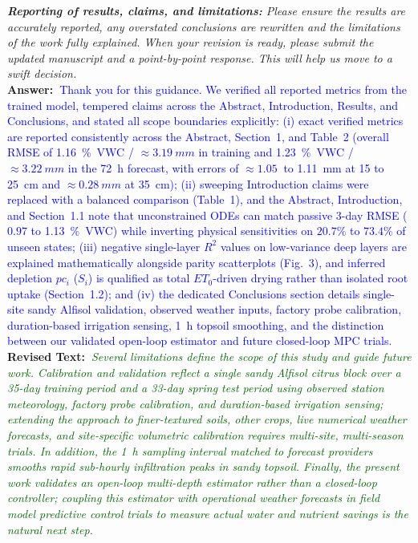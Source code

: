 \documentclass[10pt]{article}
\newcommand{\query}[2][]{\ifthenelse{\equal{#1}{}}{}{\textbf{#1:}~}\emph{#2}}
\newcommand{\ans}[1]{\textbf{Answer:~}#1}
\newcommand{\Rtext}[1]{\textbf{Revised Text:~}#1}
\begin{document}
\query[E-1.1]{\textbf{Reporting of results, claims, and limitations:} Please ensure the results are accurately reported, any overstated conclusions are rewritten and the limitations of the work fully explained. When your revision is ready, please submit the updated manuscript and a point-by-point response. This will help us move to a swift decision.}\\
\ans{\textcolor{blue}{Thank you for this guidance. We verified all reported metrics from the trained model, tempered claims across the Abstract, Introduction, Results, and Conclusions, and stated all scope boundaries explicitly: (i) exact verified metrics are reported consistently across the Abstract, Section~1, and Table~2 (overall RMSE of \SI{1.16}{\%VWC} / $\approx\SI{3.19}{mm}$ in training and \SI{1.23}{\%VWC} / $\approx\SI{3.22}{mm}$ in the 72~\si{h} forecast, with errors of $\approx\SI{1.05}{}$ to \SI{1.11}{mm} at 15 to 25~\si{cm} and $\approx\SI{0.28}{mm}$ at 35~\si{cm}); (ii) sweeping Introduction claims were replaced with a balanced comparison (Table~1), and the Abstract, Introduction, and Section~1.1 note that unconstrained ODEs can match passive 3-day RMSE ($0.97$ to \SI{1.13}{\%VWC}) while inverting physical sensitivities on $20.7\%$ to $73.4\%$ of unseen states; (iii) negative single-layer $R^2$ values on low-variance deep layers are explained mathematically alongside parity scatterplots (Fig.~3), and inferred depletion $pc_i$ ($S_i$) is qualified as total $ET_0$-driven drying rather than isolated root uptake (Section~1.2); and (iv) the dedicated Conclusions section details single-site sandy Alfisol validation, observed weather inputs, factory probe calibration, duration-based irrigation sensing, \SI{1}{h} topsoil smoothing, and the distinction between our validated open-loop estimator and future closed-loop MPC trials.}}\\
\Rtext{\emph{\textcolor{darkgreen}{Several limitations define the scope of this study and guide future work. Calibration and validation reflect a single sandy Alfisol citrus block over a 35-day training period and a 33-day spring test period using observed station meteorology, factory probe calibration, and duration-based irrigation sensing; extending the approach to finer-textured soils, other crops, live numerical weather forecasts, and site-specific volumetric calibration requires multi-site, multi-season trials. In addition, the \SI{1}{h} sampling interval matched to forecast providers smooths rapid sub-hourly infiltration peaks in sandy topsoil. Finally, the present work validates an open-loop multi-depth estimator rather than a closed-loop controller; coupling this estimator with operational weather forecasts in field model predictive control trials to measure actual water and nutrient savings is the natural next step.}}}
\end{document}

